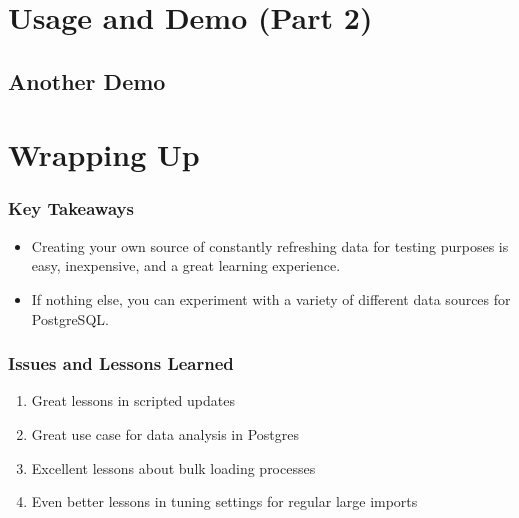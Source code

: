 \documentclass[aspectratio=169]{beamer}
\begin{document}
\section{Usage and Demo (Part 2)}
\frame{\sectionpage}
\subsection{Another Demo}

\section{Wrapping Up}
\frame{\sectionpage}

\begin{frame}
  \frametitle{Key Takeaways}
  \begin{itemize}[<+->]
    \item{Creating your own source of constantly refreshing data for testing purposes is easy, inexpensive, and a great learning experience.}
    \item{If nothing else, you can experiment with a variety of different data sources for PostgreSQL.}
  \end{itemize}
\end{frame}

\begin{frame}[fragile]
  \frametitle{Issues and Lessons Learned}
  \begin{enumerate}
    \item{Great lessons in scripted updates}
    \item{Great use case for data analysis in Postgres}
    \item{Excellent lessons about bulk loading processes}
    \item{Even better lessons in tuning settings for regular large imports}
  \end{enumerate}
\end{frame}
\end{document}
